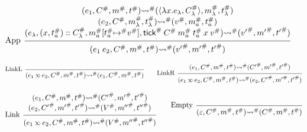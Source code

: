 \documentclass[acmsmall,review]{acmart}\settopmatter{printfolios=true,printccs=false,printacmref=false}
\theoremstyle{definition}
\newcommand*{\cons}{::}
\newcommand*{\A}[1]{{#1}^{\#}}
\newcommand*{\mem}{m}
\newcommand*{\semlink}{\mathbin{\rotatebox[origin=c]{180}{$\propto$}}}
\newcommand*{\link}[2]{{#1}\semlink{#2}}
\newcommand*{\tick}{\mathsf{tick}}
\begin{document}
\begin{figure}[h!]
  \[
    \begin{prooftree}
      \hypo{
        \begin{matrix}
          (e_{1}, \A{C}, \A\mem, \A{t})
          \A\rightsquigarrow
          (\langle\lambda x.e_{\lambda}, \A{C}_{\lambda}\rangle, \A\mem_{\lambda}, \A{t}_{\lambda}) \\
          (e_{2}, \A{C}, \A\mem_{\lambda}, \A{t}_{\lambda})
          \A\rightsquigarrow
          (\A{v}, \A\mem_{a}, \A{t}_{a})                                                            \\
          (e_{\lambda}, (x, \A{t}_{a})\cons \A{C}_{\lambda}, \A\mem_{a}[\A{t}_{a}\A\mapsto \A{v}], \A\tick\:\A{C}\:\A\mem_{a}\:\A{t}_{a}\:x\:\A{v})
          \A\rightsquigarrow
          (\A{v'}, \A{\mem'},\A{t'})
        \end{matrix}
      }
      \infer[left label={App}]1{
      (e_{1}\:e_{2}, \A{C}, \A\mem, \A{t})
      \A\rightsquigarrow
      (\A{v'}, \A{\mem'},\A{t'})
      }
    \end{prooftree}
  \]

  \[
    \begin{prooftree}
      \infer[left label=LinkL]0{
      (\link{e_{1}}{e_{2}}, \A{C}, \A\mem, \A{t})
      \A\rightsquigarrow
      (e_{1}, \A{C}, \A\mem, \A{t})
      }
    \end{prooftree}\qquad
    \begin{prooftree}
      \hypo{
        \begin{matrix}
          (e_{1}, \A{C}, \A\mem, \A{t})
          \A\rightsquigarrow
          (\A{C'}, \A{\mem'}, \A{t'})
        \end{matrix}
      }
      \infer[left label=LinkR]1{
      (\link{e_{1}}{e_{2}}, \A{C}, \A\mem, \A{t})
      \A\rightsquigarrow
      (e_{2}, \A{C'}, \A{\mem'}, \A{t'})
      }
    \end{prooftree}
  \]

  \[
    \begin{prooftree}
      \hypo{
        \begin{matrix}
          (e_{1}, \A{C}, \A\mem, \A{t})
          \A\rightsquigarrow
          (\A{C'}, \A{\mem'}, \A{t'}) \\
          (e_{2}, \A{C'}, \A{\mem'}, \A{t'})
          \A\rightsquigarrow
          (\A{V}, \A{\mem''}, \A{t''})
        \end{matrix}
      }
      \infer[left label=Link]1{
      (\link{e_{1}}{e_{2}}, \A{C}, \A\mem, \A{t})
      \A\rightsquigarrow
      (\A{V}, \A{\mem''}, \A{t''})
      }
    \end{prooftree}\qquad
    \begin{prooftree}
      \infer[left label=Empty]0{
      (\varepsilon, \A{C}, \A\mem, \A{t})
      \A\rightsquigarrow
      (\A{C}, \A\mem, \A{t})
      }
    \end{prooftree}
  \]


\end{figure}
\end{document}
